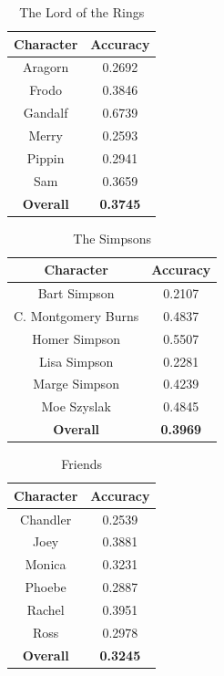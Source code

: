 \documentclass{article}
\begin{document}
\begin{titlepage}
\begin{table}[H]
    \centering
    \begin{tabular}{|c|c|}
        \hline
        \textbf{Character} & \textbf{Accuracy} \\
        \hline
        Aragorn & 0.2692 \\
        \hline
        Frodo & 0.3846 \\
        \hline
        Gandalf & 0.6739 \\
        \hline
        Merry & 0.2593 \\
        \hline
        Pippin & 0.2941 \\
        \hline
        Sam & 0.3659 \\
        \hline
        \textbf{Overall} & \textbf{0.3745} \\
        \hline
    \end{tabular}
    \caption{The Lord of the Rings}
    \label{tab:lotr_accuracy}
\end{table}

\begin{table}[H]
    \centering
    \begin{tabular}{|c|c|}
        \hline
        \textbf{Character} & \textbf{Accuracy} \\
        \hline
        Bart Simpson & 0.2107 \\
        \hline
        C. Montgomery Burns & 0.4837 \\
        \hline
        Homer Simpson & 0.5507 \\
        \hline
        Lisa Simpson & 0.2281 \\
        \hline
        Marge Simpson & 0.4239 \\
        \hline
        Moe Szyslak & 0.4845 \\
        \hline
        \textbf{Overall} & \textbf{0.3969} \\
        \hline
    \end{tabular}
    \caption{The Simpsons}
    \label{tab:simpsons_accuracy}
\end{table}

\begin{table}[H]
    \centering
    \begin{tabular}{|c|c|}
        \hline
        \textbf{Character} & \textbf{Accuracy} \\
        \hline
        Chandler & 0.2539 \\
        \hline
        Joey & 0.3881 \\
        \hline
        Monica & 0.3231 \\
        \hline
        Phoebe & 0.2887 \\
        \hline
        Rachel & 0.3951 \\
        \hline
        Ross & 0.2978 \\
        \hline
        \textbf{Overall} & \textbf{0.3245} \\
        \hline
    \end{tabular}
    \caption{Friends}
    \label{tab:friends_accuracy}
\end{table}


\end{titlepage}
\end{document}
